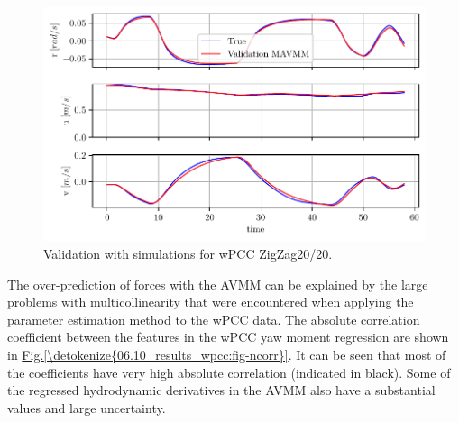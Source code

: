 \begin{figure}[!htb]
\centering
\includegraphics{kappa/images/8.pdf}
\caption{Validation with simulations for wPCC ZigZag20/20.}\label{\detokenize{06.10_results_wpcc:fig-validation-sim}}\end{figure}

The over-prediction of forces with the AVMM can be explained by the large problems with multicollinearity that were encountered when applying the parameter estimation method to the wPCC data. The absolute correlation coefficient between the features in the wPCC yaw moment regression are shown in \hyperref[\detokenize{06.10_results_wpcc:fig-ncorr}]{Fig.\@ \ref{\detokenize{06.10_results_wpcc:fig-ncorr}}}. It can be seen that most of the coefficients have very high absolute correlation (indicated in black). Some of the regressed hydrodynamic derivatives in the AVMM also have a substantial values and large uncertainty.

